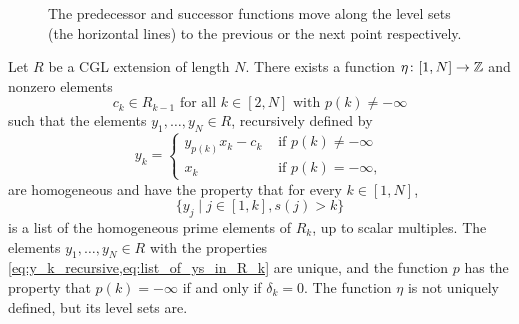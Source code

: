 \begin{figure}[h]
	\centering
	\caption{The predecessor and successor functions move along the level sets (the horizontal lines) to the previous or the next point respectively.}
	\label{fig:predecessor_successor}
\end{figure}

\begin{theorem}\label{thm:homogeneous_primes}
	Let $R$ be a CGL extension of length $N$. There exists a function $\eta \colon [1, N] \to \mathbb{Z}$ and nonzero elements
	\begin{equation*}
		c_k \in R_{k-1} \text{ for all } k \in [2,N] \text{ with } p(k) \neq - \infty
	\end{equation*}
	such that the elements $y_1, \dots, y_N \in R$, recursively defined by
	\begin{equation}\label{eq:y_k_recursive}
		y_k = \begin{cases}
			y_{p(k)}x_k - c_k & \text{ if } p(k) \neq -\infty \\
			x_k               & \text{ if } p(k) = -\infty,
		\end{cases}
	\end{equation}
	are homogeneous and have the property that for every $k \in [1, N]$,
	\begin{equation}\label{eq:list_of_ys_in_R_k}
		\{y_j \mid j \in [1, k], s(j) > k\}
	\end{equation}
	is a list of the homogeneous prime elements of $R_k$, up to scalar multiples. The
	elements $y_1, \dots, y_N \in R$ with the properties
	\cref{eq:y_k_recursive,eq:list_of_ys_in_R_k} are unique, and the function $p$ has the
	property that $p(k) = - \infty$ if and only if $\delta_k = 0$. The function $\eta$ is
	not uniquely defined, but its level sets are.
\end{theorem}

